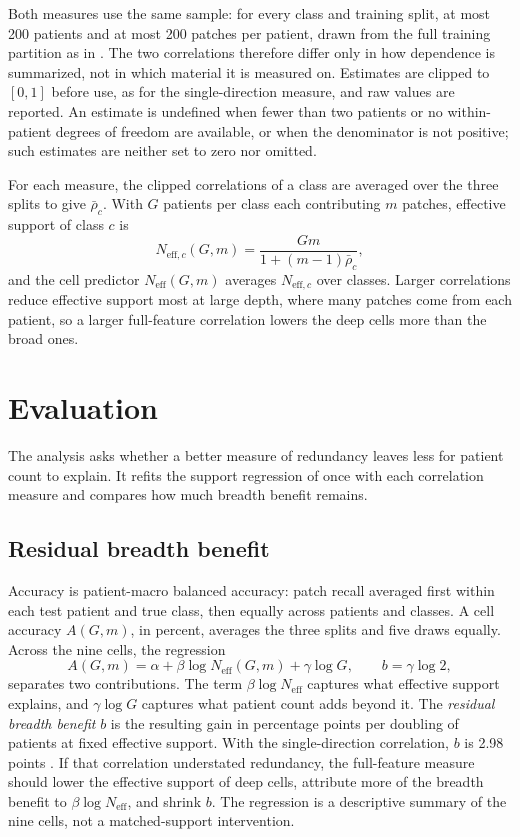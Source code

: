 \documentclass[11pt]{article}
\newcommand{\Neff}{N_{\mathrm{eff}}}
\newcommand{\Neffc}{N_{\mathrm{eff},c}}
\begin{document}
Both measures use the same sample: for every class and training split, at most 200 patients and at most 200 patches per patient, drawn from the full training partition as in \citet{queisler2026effectiveSupport}. The two correlations therefore differ only in how dependence is summarized, not in which material it is measured on. Estimates are clipped to $[0,1]$ before use, as for the single-direction measure, and raw values are reported. An estimate is undefined when fewer than two patients or no within-patient degrees of freedom are available, or when the denominator is not positive; such estimates are neither set to zero nor omitted.

For each measure, the clipped correlations of a class are averaged over the three splits to give $\bar\rho_c$. With $G$ patients per class each contributing $m$ patches, effective support of class $c$ is
\begin{equation}
 \Neffc(G,m)=\frac{Gm}{1+(m-1)\bar\rho_c},
 \label{eq:neff}
\end{equation}
\noindent and the cell predictor $\Neff(G,m)$ averages $\Neffc$ over classes. Larger correlations reduce effective support most at large depth, where many patches come from each patient, so a larger full-feature correlation lowers the deep cells more than the broad ones.

\section{Evaluation}
\label{sec:evaluation}
The analysis asks whether a better measure of redundancy leaves less for patient count to explain. It refits the support regression of \citet{queisler2026effectiveSupport} once with each correlation measure and compares how much breadth benefit remains.

\subsection{Residual breadth benefit}
\label{sec:residual}
Accuracy is patient-macro balanced accuracy: patch recall averaged first within each test patient and true class, then equally across patients and classes. A cell accuracy $A(G,m)$, in percent, averages the three splits and five draws equally. Across the nine cells, the regression
\begin{equation}
 A(G,m)=\alpha+\beta\log\Neff(G,m)+\gamma\log G,
 \qquad b=\gamma\log 2,
 \label{eq:surface}
\end{equation}
\noindent separates two contributions. The term $\beta\log\Neff$ captures what effective support explains, and $\gamma\log G$ captures what patient count adds beyond it. The \emph{residual breadth benefit} $b$ is the resulting gain in percentage points per doubling of patients at fixed effective support. With the single-direction correlation, $b$ is 2.98 points \citep{queisler2026effectiveSupport}. If that correlation understated redundancy, the full-feature measure should lower the effective support of deep cells, attribute more of the breadth benefit to $\beta\log\Neff$, and shrink $b$. The regression is a descriptive summary of the nine cells, not a matched-support intervention.
\end{document}
